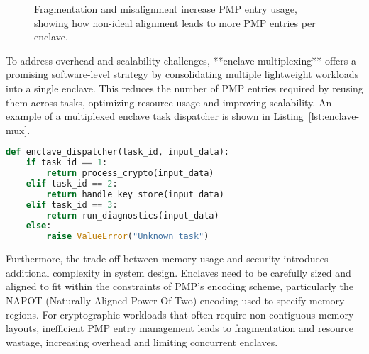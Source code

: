 \begin{figure}[htbp]
\centering
{}
\caption{Fragmentation and misalignment increase PMP entry usage, showing how non-ideal alignment leads to more PMP entries per enclave.}
\label{fig:pmp-fragmentation-entries}
\end{figure}

To address overhead and scalability challenges, **enclave multiplexing** offers a promising software-level strategy by consolidating multiple lightweight workloads into a single enclave. This reduces the number of PMP entries required by reusing them across tasks, optimizing resource usage and improving scalability. An example of a multiplexed enclave task dispatcher is shown in Listing~\ref{lst:enclave-mux}.

\begin{lstlisting}[language=Python, caption={Multiplexed enclave task dispatcher.}, label={lst:enclave-mux}]
def enclave_dispatcher(task_id, input_data):
    if task_id == 1:
        return process_crypto(input_data)
    elif task_id == 2:
        return handle_key_store(input_data)
    elif task_id == 3:
        return run_diagnostics(input_data)
    else:
        raise ValueError("Unknown task")
\end{lstlisting}

Furthermore, the trade-off between memory usage and security introduces additional complexity in system design. Enclaves need to be carefully sized and aligned to fit within the constraints of PMP's encoding scheme, particularly the NAPOT (Naturally Aligned Power-Of-Two) encoding used to specify memory regions. For cryptographic workloads that often require non-contiguous memory layouts, inefficient PMP entry management leads to fragmentation and resource wastage, increasing overhead and limiting concurrent enclaves.

